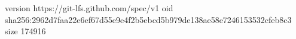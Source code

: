 version https://git-lfs.github.com/spec/v1
oid sha256:2962d7faa22e6ef67d55e9e4f2b5ebcd5b979de138ae58e7246153532cfeb8c3
size 174916
